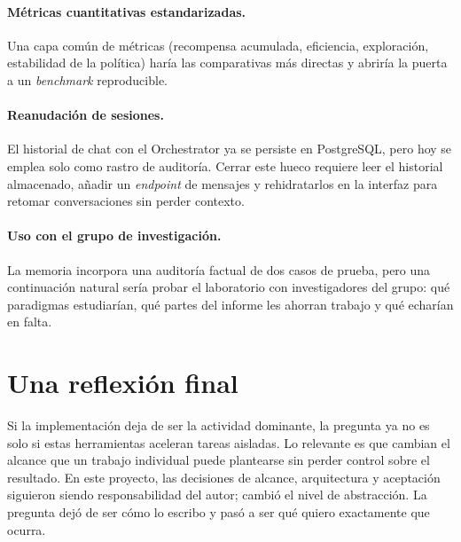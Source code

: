 \paragraph{Métricas cuantitativas estandarizadas.} Una capa común de métricas
(recompensa acumulada, eficiencia, exploración, estabilidad de la política)
haría las comparativas más directas y abriría la puerta a un
\textit{benchmark} reproducible.

\paragraph{Reanudación de sesiones.} El historial de chat con el
Orchestrator ya se persiste en PostgreSQL, pero hoy se emplea solo como rastro
de auditoría. Cerrar este hueco requiere leer el historial almacenado, añadir
un \textit{endpoint} de mensajes y rehidratarlos en la interfaz para retomar
conversaciones sin perder contexto.

\paragraph{Uso con el grupo de investigación.} La memoria incorpora una
auditoría factual de dos casos de prueba, pero una continuación natural sería
probar el laboratorio con investigadores del grupo: qué paradigmas estudiarían,
qué partes del informe les ahorran trabajo y qué echarían en falta.

\section{Una reflexión final}

Si la implementación deja de ser la actividad dominante, la pregunta ya no es
solo si estas herramientas aceleran tareas aisladas. Lo relevante es que cambian
el alcance que un trabajo individual puede plantearse sin perder control sobre
el resultado. En este proyecto, las decisiones de alcance, arquitectura y
aceptación siguieron siendo responsabilidad del autor; cambió el nivel de
abstracción. La pregunta dejó de ser cómo lo escribo y pasó a ser qué quiero
exactamente que ocurra.
